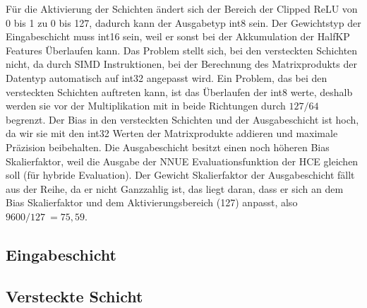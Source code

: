 Für die Aktivierung der Schichten ändert sich der Bereich der Clipped \ac{ReLU} von 0 bis 1 zu 0 bis 127, dadurch kann der Ausgabetyp int8 sein. Der Gewichtstyp der Eingabeschicht muss int16 sein, weil er sonst bei der Akkumulation der HalfKP Features Überlaufen kann. Das Problem stellt sich, bei den versteckten Schichten nicht, da durch \ac{SIMD} Instruktionen, bei der Berechnung des Matrixprodukts der Datentyp automatisch auf int32 angepasst wird. Ein Problem, das bei den versteckten Schichten auftreten kann, ist das Überlaufen der int8 werte, deshalb werden sie vor der Multiplikation mit in beide Richtungen durch $127/64$ begrenzt. Der Bias in den versteckten Schichten und der Ausgabeschicht ist hoch, da wir sie mit den int32 Werten der Matrixprodukte addieren und maximale Präzision beibehalten. Die Ausgabeschicht besitzt einen noch höheren Bias Skalierfaktor, weil die Ausgabe der \ac{NNUE} Evaluationsfunktion der \ac{HCE} gleichen soll (für hybride Evaluation). Der Gewicht Skalierfaktor der Ausgabeschicht fällt aus der Reihe, da er nicht Ganzzahlig ist, das liegt daran, dass er sich an dem Bias Skalierfaktor und dem Aktivierungsbereich (127) anpasst, also $9600/127~=75,59$.

\subsection{Eingabeschicht}


\subsection{Versteckte Schicht}